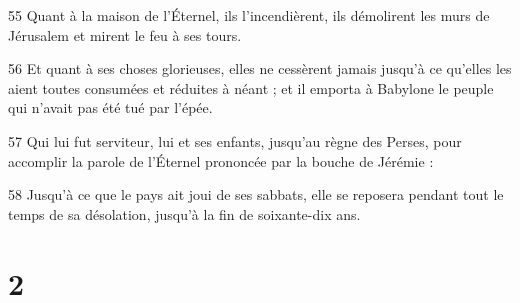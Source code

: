 \par 55 Quant à la maison de l'Éternel, ils l'incendièrent, ils démolirent les murs de Jérusalem et mirent le feu à ses tours.
\par 56 Et quant à ses choses glorieuses, elles ne cessèrent jamais jusqu'à ce qu'elles les aient toutes consumées et réduites à néant ; et il emporta à Babylone le peuple qui n'avait pas été tué par l'épée.
\par 57 Qui lui fut serviteur, lui et ses enfants, jusqu'au règne des Perses, pour accomplir la parole de l'Éternel prononcée par la bouche de Jérémie :
\par 58 Jusqu'à ce que le pays ait joui de ses sabbats, elle se reposera pendant tout le temps de sa désolation, jusqu'à la fin de soixante-dix ans.

\chapter{2}

